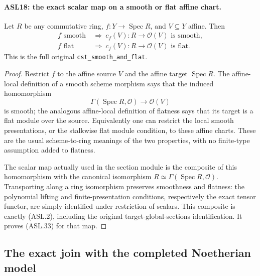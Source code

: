 \documentclass[11pt,a4paper]{article}
\numberwithin{equation}{section}
\theoremstyle{remark}\newtheorem{remark}[theorem]{Remark}
\begin{document}
\paragraph{ASL18: the exact scalar map on a smooth or flat affine chart.}
\label{claim:ASL18}
Let $R$ be any commutative ring, $f:Y\to\operatorname{Spec}R$,
and $V\subseteq Y$ affine.  Then
\[
 \begin{split}
 f\text{ smooth}&\ \Longrightarrow\ c_f(V):R\to\mathcal O(V)
                                    \text{ is smooth},\\
 f\text{ flat}&\ \Longrightarrow\ c_f(V):R\to\mathcal O(V)
                                    \text{ is flat}.
 \end{split}                                            \tag{ASL.33}
\]
This is the full original \texttt{cst\_\allowbreak{}smooth\_\allowbreak{}and\_\allowbreak{}flat}.

\begin{proof}
Restrict $f$ to the affine source $V$ and the affine target
$\operatorname{Spec}R$.  The affine-local definition of a
smooth scheme morphism says that the induced homomorphism
\[
 \Gamma(\operatorname{Spec}R,\mathcal O)
                              \longrightarrow\mathcal O(V)
\]
is smooth; the analogous affine-local definition of flatness
says that its target is a flat module over the source.
Equivalently one can restrict the local smooth presentations,
or the stalkwise flat module condition, to these affine charts.
These are the usual scheme-to-ring meanings of the two
properties, with no finite-type assumption added to flatness.

The scalar map actually used in the section module is the
composite of this homomorphism with the canonical isomorphism
$R\simeq\Gamma(\operatorname{Spec}R,\mathcal O)$.
Transporting along a ring isomorphism preserves smoothness
and flatness: the polynomial lifting and finite-presentation
conditions, respectively the exact tensor functor, are simply
identified under restriction of scalars.  This composite is
exactly (ASL.2), including the original target-global-sections
identification.  It proves (ASL.33) for that map.
\end{proof}

\subsection{The exact join with the completed Noetherian model}

\end{document}
